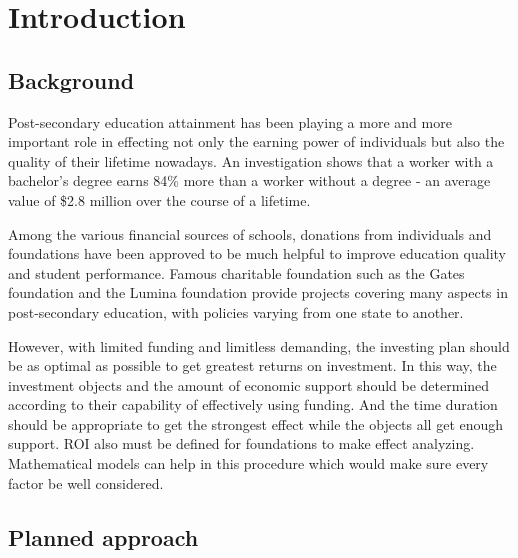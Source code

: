 
\section{Introduction}


  \subsection{Background}
    Post-secondary education attainment has been playing a more and more important role in effecting not only the earning power of individuals but also the quality of their lifetime nowadays. An investigation shows that a worker with a bachelor's degree earns 84\% more than a worker without a degree - an average value of \$2.8 million over the course of a lifetime\cite{url1}.

	Among the various financial sources of schools, donations from individuals and foundations have been approved to be much helpful to improve education quality and student performance. Famous charitable foundation such as the Gates foundation and the Lumina foundation provide projects covering many aspects in post-secondary education, with policies varying from one state to another.

   However, with limited funding and limitless demanding, the investing plan should be as optimal as possible to get greatest returns on investment. In this way, the investment objects and the amount of economic support should be determined according to their capability of effectively using funding. And the time duration should be appropriate to get the strongest effect while the objects all get enough support. ROI also must be defined for foundations to make effect analyzing. Mathematical models can help in this procedure which would make sure every factor be well considered.


  \subsection{Planned approach}

